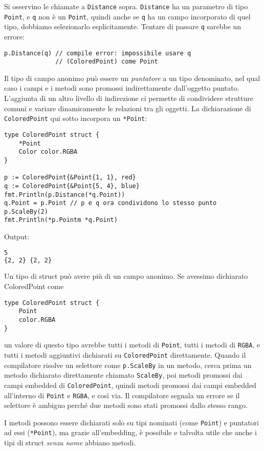 Si osservino le chiamate a \verb|Distance| sopra.
\verb|Distance| ha un parametro di tipo \verb|Point|, e \verb|q| non è un \verb|Point|, quindi anche se \verb|q| ha un campo incorporato di quel tipo, dobbiamo selezionarlo esplicitamente.
Tentare di passare \verb|q| sarebbe un errore:
\begin{lstlisting}[frame=single, label={lst:lstlisting5-3.4}]
p.Distance(q) // compile error: impossibile usare q
              // (ColoredPoint) come Point
\end{lstlisting}
Il tipo di campo anonimo può essere un \textit{puntatore} a un tipo denominato, nel qual caso i campi e i metodi sono promossi indirettamente dall'oggetto puntato.
L'aggiunta di un altro livello di indirezione ci permette di condividere strutture comuni e variare dinamicamente le relazioni tra gli oggetti.
La dichiarazione di \verb|ColoredPoint| qui sotto incorpora un \verb|*Point|:
\begin{lstlisting}[frame=single, label={lst:lstlisting5-3.5}]
type ColoredPoint struct {
    *Point
    Color color.RGBA
}

p := ColoredPoint{&Point{1, 1}, red}
q := ColoredPoint{&Point{5, 4}, blue}
fmt.Println(p.Distance(*q.Point))
q.Point = p.Point // p e q ora condividono lo stesso punto
p.ScaleBy(2)
fmt.Println(*p.Pointm *q.Point)
\end{lstlisting}
Output:
\begin{lstlisting}[language=bash, frame=L, label={lst:lstlisting5-3.6}]
5
{2, 2} {2, 2}
\end{lstlisting}
Un tipo di struct può avere più di un campo anonimo.
Se avessimo dichiarato ColoredPoint come
\begin{lstlisting}[frame=single, label={lst:lstlisting5-3.7}]
type ColoredPoint struct {
    Point
    color.RGBA
}
\end{lstlisting}
un valore di questo tipo avrebbe tutti i metodi di \verb|Point|, tutti i metodi di \verb|RGBA|, e tutti i metodi aggiuntivi dichiarati su \verb|ColoredPoint| direttamente.
Quando il compilatore risolve un selettore come \verb|p.ScaleBy| in un metodo, cerca prima un metodo dichiarato direttamente chiamato \verb|ScaleBy|, poi metodi promossi dai campi embedded di \verb|ColoredPoint|, quindi metodi promossi dai campi embedded all'interno di \verb|Point| e \verb|RGBA|, e così via.
Il compilatore segnala un errore se il selettore è ambiguo perché due metodi sono stati promossi dallo stesso rango.

I metodi possono essere dichiarati solo su tipi nominati (come \verb|Point|) e puntatori ad essi (\verb|*Point|), ma grazie all'embedding, è possibile e talvolta utile che anche i tipi di struct \textit{senza nome} abbiano metodi.

